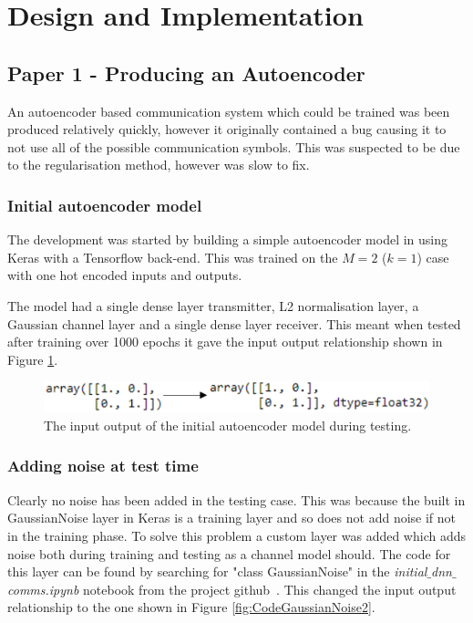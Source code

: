 \documentclass[12pt,onecolumn,letterpaper]{article}
\newcommand{\code}{\textit}
\begin{document}
\FloatBarrier
\section{Design and Implementation}

\subsection{Paper 1 - Producing an Autoencoder}

An autoencoder based communication system which could be trained was been produced relatively quickly, however it originally contained a bug causing it to not use all of the possible communication symbols. This was suspected to be due to the regularisation method, however was slow to fix.

\subsubsection{Initial autoencoder model}

The development was started by building a simple autoencoder model in using Keras with a Tensorflow back-end. This was trained on the $M=2$ ($k=1$) case with one hot encoded inputs and outputs. 

The model had a single dense layer transmitter, L2 normalisation layer, a Gaussian channel layer and a single dense layer receiver. This meant when tested after training over 1000 epochs it gave the input output relationship shown in Figure \ref{fig:CodeInitialOutput}.

\begin{figure}[t]
\begin{center}
   \includegraphics[width=0.8\linewidth]{figures/initial_ae_output.png}
\end{center}
   \caption{The input output of the initial autoencoder model during testing. }
\label{fig:CodeInitialOutput}
\end{figure}

\subsubsection{Adding noise at test time}

Clearly no noise has been added in the testing case. This was because the built in GaussianNoise layer in Keras is a training layer and so does not add noise if not in the training phase. To solve this problem a custom layer was added which adds noise both during training and testing as a channel model should. The code for this layer can be found by searching for "class GaussianNoise" in the \code{initial$\_$dnn$\_$comms.ipynb} notebook from the project github~\cite{AwGithub}. This changed the input output relationship to the one shown in Figure \ref{fig:CodeGaussianNoise2}.
\end{document}
